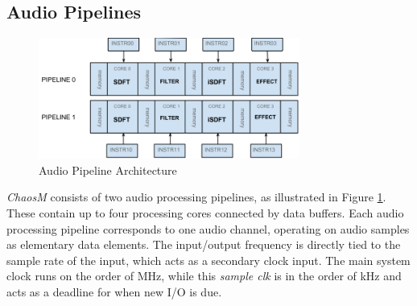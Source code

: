 \FloatBarrier
\subsection{Audio Pipelines}\label{subsec:audio_pipelines}

\begin{figure}[H]
    \centering
    \includegraphics[height=150px]{figures/fpga/system_components_general_pipeline.png}
    \caption{Audio Pipeline Architecture}
    \label{fig:pipeline_architecture}
\end{figure}

\textit{ChaosM} consists of two audio processing pipelines, as illustrated in
Figure \ref{fig:pipeline_architecture}. These contain up to four processing cores
connected by data buffers. Each audio processing pipeline corresponds to one audio channel, operating on audio samples as elementary data elements.
The input/output frequency is directly tied to the sample rate of the input, which acts as a secondary clock input. The main system clock runs on the order of MHz, while this \textit{sample clk} is in the order of kHz and acts as a deadline for when new I/O is due.
